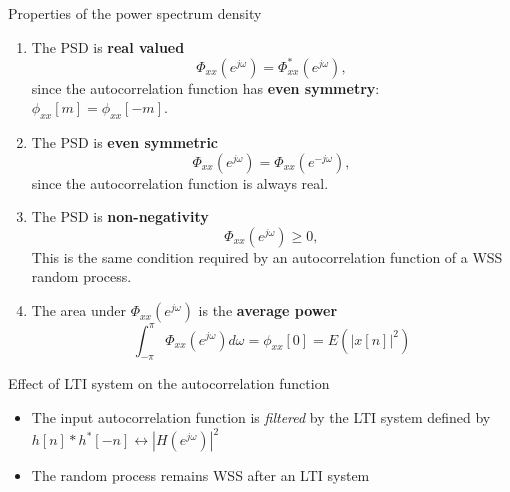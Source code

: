 \documentclass[10pt, handout]{beamer}
\begin{document}
\begin{frame}{Properties of the power spectrum density}

\begin{enumerate} 
	\item The PSD is \textbf{real valued}
	\begin{equation*}
	\Phi_{xx}(e^{j\omega}) = \Phi^*_{xx}(e^{j\omega}),
	\end{equation*}
	since the autocorrelation function has\textbf{ even symmetry}: $\phi_{xx}[m] = \phi_{xx}[-m]$.
	
	\item The PSD is \textbf{even symmetric} 
	\begin{equation*}
	\Phi_{xx}(e^{j\omega}) = \Phi_{xx}(e^{-j\omega}),
	\end{equation*}
	since the autocorrelation function is always real. 
	
	\item The PSD is \textbf{non-negativity} 
	\begin{equation*}
	\Phi_{xx}(e^{j\omega}) \geq 0,
	\end{equation*}
	This is the same condition required by an autocorrelation function of a WSS random process.
	
	\item The area under $\Phi_{xx}(e^{j\omega})$ is the \textbf{average power}
	\begin{equation*}
	\int_{-\pi}^{\pi} \Phi_{xx}(e^{j\omega})d\omega = \phi_{xx}[0] = E(|x[n]|^2)
	\end{equation*}
	
\end{enumerate} 

\end{frame}

\begin{frame}{Effect of LTI system on the autocorrelation function}
\begin{center}
	\resizebox{0.8\linewidth}{!}{}
\end{center}

\begin{itemize}
	\item The input autocorrelation function is \textit{filtered} by the LTI system defined by $h[n]\ast h^*[-n] \leftrightarrow |H(e^{j\omega})|^2$ 
	\item The random process remains WSS after an LTI system
\end{itemize}

\end{frame}
\end{document}
